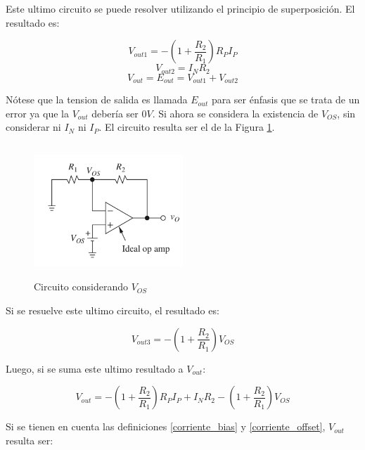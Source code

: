 Este ultimo circuito se puede resolver utilizando el principio de superposición. El resultado es:


\begin{displaymath} V_{out1} = -(1+\frac{R_2}{R_1})R_P I_P \end{displaymath}
\begin{displaymath} V_{out2} = I_N R_2 \end{displaymath}
\begin{displaymath} V_{out} = E_{out} = V_{out1} + V_{out2} \end{displaymath}

Nótese que la tension de salida es llamada $E_{out}$ para ser énfasis que se trata de un error ya que la $V_{out}$ debería ser $0V$. 
Si ahora se considera la existencia de $V_{OS}$, sin considerar  ni $I_{N}$ ni $I_{P}$. El circuito resulta ser el de la Figura \ref{fig_3}.
 

\begin{figure}[ht]                                                       
    \centering\includegraphics[width=0.5\textwidth, height=5cm]{../Ex3/Figuras/fig_3.png}
    \caption{Circuito considerando $V_{OS}$}
    \label{fig_3}
    \end{figure}


Si se resuelve este ultimo circuito, el resultado es:

\begin{displaymath} V_{out3} = -(1+\frac{R_2}{R_1})V_{OS} \end{displaymath}

Luego, si se suma este ultimo resultado a $V_{out}$:

\begin{equation} V_{out} = -(1+\frac{R_2}{R_1})R_PI_P + I_N R_2 -(1+\frac{R_2}{R_1})V_{OS} \label{V_out_teorico}\end{equation}

Si se tienen en cuenta las definiciones \ref{corriente_bias} y \ref{corriente_offset}, $V_{out}$ resulta ser:

